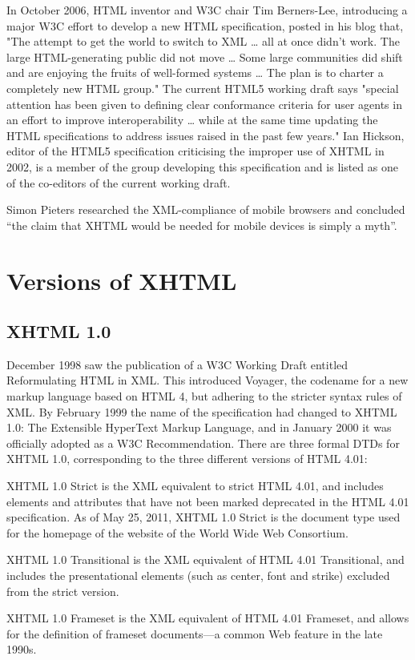 In October 2006, HTML inventor and W3C chair Tim Berners-Lee, introducing a major W3C effort to develop a new HTML specification, posted in his blog that, "The attempt to get the world to switch to XML … all at once didn't work. The large HTML-generating public did not move … Some large communities did shift and are enjoying the fruits of well-formed systems … The plan is to charter a completely new HTML group." The current HTML5 working draft says "special attention has been given to defining clear conformance criteria for user agents in an effort to improve interoperability … while at the same time updating the HTML specifications to address issues raised in the past few years." Ian Hickson, editor of the HTML5 specification criticising the improper use of XHTML in 2002, is a member of the group developing this specification and is listed as one of the co-editors of the current working draft.

Simon Pieters researched the XML-compliance of mobile browsers and concluded “the claim that XHTML would be needed for mobile devices is simply a myth”.



\chapter{Versions of XHTML}





\section{XHTML 1.0}

December 1998 saw the publication of a W3C Working Draft entitled Reformulating HTML in XML. This introduced Voyager, the codename for a new markup language based on HTML 4, but adhering to the stricter syntax rules of XML. By February 1999 the name of the specification had changed to XHTML 1.0: The Extensible HyperText Markup Language, and in January 2000 it was officially adopted as a W3C Recommendation. There are three formal DTDs for XHTML 1.0, corresponding to the three different versions of HTML 4.01:

\begin{compactitem}
\item XHTML 1.0 Strict is the XML equivalent to strict HTML 4.01, and includes elements and attributes that have not been marked deprecated in the HTML 4.01 specification. As of May 25, 2011, XHTML 1.0 Strict is the document type used for the homepage of the website of the World Wide Web Consortium.

\item XHTML 1.0 Transitional is the XML equivalent of HTML 4.01 Transitional, and includes the presentational elements (such as center, font and strike) excluded from the strict version.

\item XHTML 1.0 Frameset is the XML equivalent of HTML 4.01 Frameset, and allows for the definition of frameset documents—a common Web feature in the late 1990s.

\end{compactitem}

